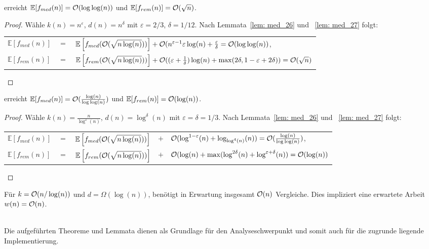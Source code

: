 \begin{manualtheorem}{28}\label{theo: med_28}
\RM erreicht $\mathbb{E}[f_{med}(n)] = \mathcal{O}(\log\log(n))$ und $\mathbb{E}[f_{rem}(n)]=\mathcal{O}(\sqrt{n})$.
\end{manualtheorem}
\begin{proof}
Wähle $k(n)=n^{\varepsilon}$, $d(n)=n^{\delta}$ mit $\varepsilon=2/3$, $\delta=1/12$. Nach Lemmata~\ref{lem: med_26} und ~\ref{lem: med_27} folgt:

\begin{center}
\begin{tabular}{lcl}
$\mathbb{E}[f_{med}(n)]$& $=$&$\mathbb{E}\left[f_{med}(\mathcal{O}(\sqrt{n \log(n)}))\right]+\mathcal{O}(n^{\varepsilon - 1} \varepsilon \log(n) + \frac{\varepsilon}{\delta}=\mathcal{O}(\log\log(n))$,\\
$\mathbb{E}[f_{rem}(n)]$& $=$&$\mathbb{E}\left[f_{rem}(\mathcal{O}(\sqrt{n \log(n)}))\right]+\mathcal{O}((\varepsilon + \frac{1}{\delta})\log(n) + \max(2\delta, 1-\varepsilon + 2\delta))=\mathcal{O}(\sqrt{n})$
\end{tabular}
\end{center}
\end{proof}



\begin{manualtheorem}{29}\label{theo: med_29}
\RM erreicht $\mathbb{E}[f_{med}(n)] = \mathcal{O}(\frac{\log(n)}{\log\log(n)})$ und $\mathbb{E}[f_{rem}(n)]=\mathcal{O}(\log(n))$.
\end{manualtheorem}
\begin{proof}
Wähle $k(n)=\frac{n}{\log^{\varepsilon}(n)}$, $d(n)=\log^{\delta}(n)$ mit $\varepsilon=\delta=1/3$. Nach Lemmata~\ref{lem: med_26} und ~\ref{lem: med_27} folgt:
\begin{center}
\begin{tabular}{lclcl}
$\mathbb{E}[f_{med}(n)]$& $=$&$\mathbb{E}\left[f_{med}(\mathcal{O}(\sqrt{n \log(n)}))\right]$& $+$&$\mathcal{O}(\log^{1-\varepsilon}(n) + \log_{\log^4(n)}(n))=\mathcal{O}(\frac{\log(n)}{\log\log(n)})$,\\
$\mathbb{E}[f_{rem}(n)]$& $=$&$\mathbb{E}\left[f_{rem}(\mathcal{O}(\sqrt{n \log(n)}))\right]$& $+$&$\mathcal{O}(\log(n) + \max(\log^{2\delta}(n) + \log^{\varepsilon + \delta}(n))=\mathcal{O}(\log(n))$
\end{tabular}
\end{center}

\end{proof}



\begin{manualtheorem}{30}\label{theo: med_30}
Für $k=\mathcal{O}(n/\log(n))$ und $d=\Omega(\log(n))$, \RM benötigt in Erwartung insgesamt $\mathcal{O}(n)$ Vergleiche. Dies impliziert eine erwartete Arbeit $w(n)=\mathcal{O}(n)$.
\end{manualtheorem}

\noindent\makebox[\linewidth]{\color{gray}{\hdashrule[0.5ex]{\linewidth}{0.5pt}{1.5mm}}}\\[.05cm]
\noindent
Die aufgeführten Theoreme und Lemmata dienen als Grundlage für den Analyseschwerpunkt und somit auch für die zugrunde liegende Implementierung. 


